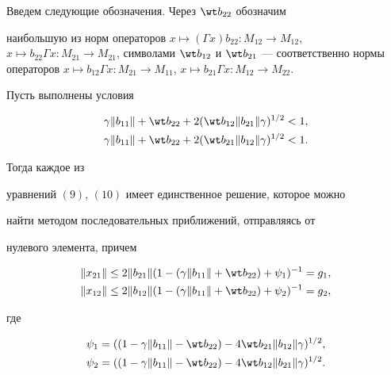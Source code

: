 Введем следующие обозначения. Через $\wt b_{22}$ обозначим


наибольшую из норм операторов $x\mapsto(\Gamma


x)b_{22}:M_{12}\to M_{12}$, $x\mapsto b_{22}\Gamma


x:M_{21}\to M_{21}$, символами $\wt b_{12}$ и $\wt


b_{21}$ --- соответственно нормы операторов $x\mapsto


b_{12}\Gamma x:M_{21}\to M_{11}$, $x\mapsto b_{21}\Gamma


x:M_{12}\to M_{22}$.








\begin{thm}


Пусть выполнены условия


\begin{align}


\gamma\|b_{11}\|+\wt b_{22}+2(\wt b_{12}\|b_{21}\|\gamma)^{1/2}&<1,\\


%


\gamma\|b_{11}\|+\wt b_{22}+2(\wt b_{21}\|b_{12}\|\gamma)^{1/2}&<1.


\end{align}


Тогда каждое из


уравнений $(9)$, $(10)$ имеет единственное решение, которое можно


найти методом последовательных приближений, отправляясь от


нулевого элемента, причем


\begin{align*}


\|x_{21}\|\le2\|b_{21}\|(1-(\gamma\|b_{11}\|+\wt b_{22})+\psi_1)^{-1}&=g_1,\\


%


\|x_{12}\|\le2\|b_{12}\|(1-(\gamma\|b_{11}\|+\wt b_{22})+\psi_2)^{-1}&=g_2,


\end{align*}


где


\begin{gather*}


\psi_1=((1-\gamma\|b_{11}\|-\wt b_{22})-4\wt b_{21}\|b_{12}\|\gamma)^{1/2},\\


%


\psi_2=((1-\gamma\|b_{11}\|-\wt b_{22})-4\wt b_{12}\|b_{21}\|\gamma)^{1/2}.


\end{gather*}


\end{thm}








